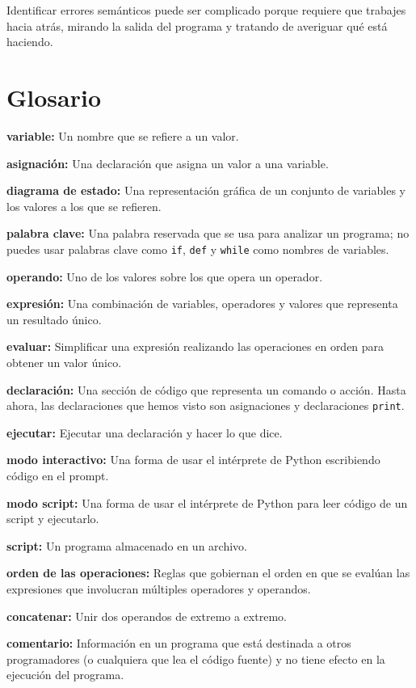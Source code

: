 Identificar errores semánticos puede ser complicado porque requiere que trabajes hacia atrás, mirando la salida del programa y tratando de averiguar qué está haciendo.

\section{Glosario}

\textbf{variable:} Un nombre que se refiere a un valor.

\textbf{asignación:} Una declaración que asigna un valor a una variable.

\textbf{diagrama de estado:} Una representación gráfica de un conjunto de variables y los valores a los que se refieren.

\textbf{palabra clave:} Una palabra reservada que se usa para analizar un programa; no puedes usar palabras clave como \texttt{if}, \texttt{def} y \texttt{while} como nombres de variables.

\textbf{operando:} Uno de los valores sobre los que opera un operador.

\textbf{expresión:} Una combinación de variables, operadores y valores que representa un resultado único.

\textbf{evaluar:} Simplificar una expresión realizando las operaciones en orden para obtener un valor único.

\textbf{declaración:} Una sección de código que representa un comando o acción. Hasta ahora, las declaraciones que hemos visto son asignaciones y declaraciones \texttt{print}.

\textbf{ejecutar:} Ejecutar una declaración y hacer lo que dice.

\textbf{modo interactivo:} Una forma de usar el intérprete de Python escribiendo código en el prompt.

\textbf{modo script:} Una forma de usar el intérprete de Python para leer código de un script y ejecutarlo.

\textbf{script:} Un programa almacenado en un archivo.

\textbf{orden de las operaciones:} Reglas que gobiernan el orden en que se evalúan las expresiones que involucran múltiples operadores y operandos.

\textbf{concatenar:} Unir dos operandos de extremo a extremo.

\textbf{comentario:} Información en un programa que está destinada a otros programadores (o cualquiera que lea el código fuente) y no tiene efecto en la ejecución del programa.

